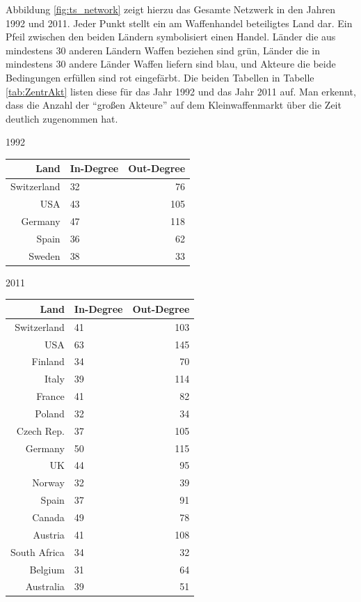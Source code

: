 \documentclass[a4paper,ngerman,oneside,titlepage,bibliography=totoc,11pt]{scrreprt}
\begin{document}
Abbildung \ref{fig:ts_network} zeigt hierzu das Gesamte Netzwerk in den Jahren 1992 und 2011. Jeder Punkt stellt ein am Waffenhandel beteiligtes Land dar. Ein Pfeil zwischen den beiden Ländern symbolisiert einen Handel. Länder die aus mindestens 30 anderen Ländern Waffen beziehen sind grün, Länder die in mindestens 30 andere Länder Waffen liefern sind blau, und Akteure die beide Bedingungen erfüllen sind rot eingefärbt. Die beiden Tabellen in Tabelle \ref{tab:ZentrAkt} listen diese für das Jahr 1992 und das Jahr 2011 auf. Man erkennt, dass die Anzahl der "`großen Akteure"' auf dem Kleinwaffenmarkt über die Zeit deutlich zugenommen hat.


\begin{table}[ht]
\centering
\footnotesize
\begin{minipage}[t]{0.48\textwidth}

\begin{center}
1992
\end{center}

\begin{tabular}{rlr}
  \hline
 Land 											& In-Degree & Out-Degree\\ 
  \hline
 Switzerland 								& 32				& 76\\ 
 USA 	& 43				& 105\\ 
 Germany & 47				& 118\\ 
 Spain 											& 36				& 62\\ 
 Sweden 										& 38 				& 33\\ 
   \hline

\end{tabular}
\end{minipage}
\hfill	
\begin{minipage}[t]{0.48\textwidth}

\begin{center}
2011
\end{center}

\begin{tabular}{rlr}
  \hline
 Land 						& In-Degree & Out-Degree\\ 
  \hline
 Switzerland 			& 41				& 103\\ 
 USA					 		& 63				& 145\\ 
 Finland 					& 34				& 70\\ 
 Italy 						& 39 				& 114\\ 
 France						& 41				& 82\\ 
 Poland						& 32				& 34\\
 Czech Rep.		& 37				& 105\\
 Germany					& 50				& 115\\
 UK		& 44				& 95\\
 Norway						& 32				& 39\\
 Spain  					& 37				& 91\\
 Canada						& 49				& 78\\
 Austria					& 41				& 108\\
 South Africa			& 34				& 32\\
 Belgium					& 31				& 64\\
 Australia				& 39				& 51\\
   \hline


\end{tabular}
\end{minipage}
\end{table}
\end{document}
